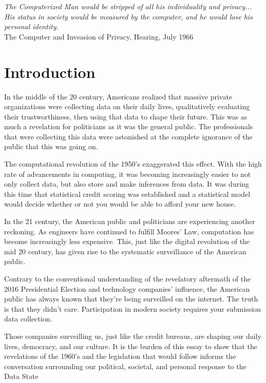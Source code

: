 \begin{center}
\textit{
The Computerized Man would be stripped of all his individuality and privacy...
His status in society would be measured by the computer,
and he would lose his personal identity.} \\
The Computer and Invsasion of Privacy, Hearing, July 1966
\end{center}

\section{Introduction}

In the middle of the 20 century, Americans realized that massive private
organizations were collecting data on their daily lives, qualitatively
evaluating their trustworthiness, then using that data to shape their future.
This was as much a revelation for politicians as it was the general public.
The professionals that were collecting this data were astonished at the complete
ignorance of the public that this was going on.

The computational revolution of the 1950's exaggerated this effect. With the
high rate of advancements in computing, it was becoming increasingly easier to
not only collect data, but also store and make inferences from data. It was
during this time that statistical credit scoring was established and a
statistical model would decide whether or not you would be able to afford your
new house.

In the 21 century, the American public and politicians are experiencing
another reckoning. As engineers have continued to fulfill Moores' Law,
computation has become increasingly less expensive. This, just like the digital
revolution of the mid 20 century, has given rise to the systematic
surveillance of the American public.

Contrary to the conventional understanding of the revelatory aftermath of the
2016 Presidential Election and technology companies' influence, the American
public has always known that they're being surveilled on the internet. The truth
is that they didn't care. Participation in modern society requires your submission
data collection.

Those companies surveilling us, just like the credit bureaus, are shaping our
daily lives, democracy, and our culture.
It is the burden of this essay to show that the revelations of the 1960's
and the legislation that would follow %
informs the conversation surrounding our political, societal, and personal
response to the Data State %

